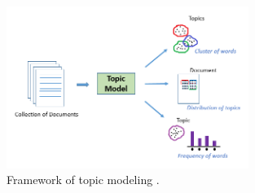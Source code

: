 \documentclass{article}
\begin{document}
\begin{figure}
\centering
\includegraphics[width=0.7\textwidth]{figures/topic_modeling.png}
\caption{\label{fig:topic_modeling}Framework of topic modeling \citep{usmani_natural_2021}.}
\end{figure}

\end{document}
